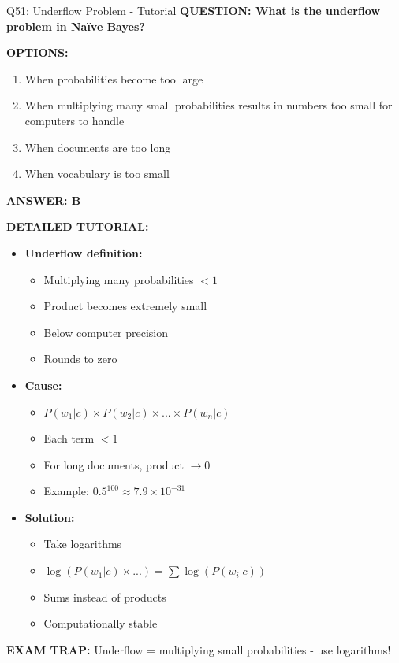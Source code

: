 \documentclass[8pt]{beamer}
\begin{document}
	\begin{frame}{Q51: Underflow Problem - Tutorial}
		\fontsize{6.5}{7.5}\selectfont
		\textbf{QUESTION: What is the underflow problem in Naïve Bayes?}
		
		\vspace{0.1cm}
		\textbf{OPTIONS:}
		\begin{enumerate}
			\item When probabilities become too large
			\item When multiplying many small probabilities results in numbers too small for computers to handle
			\item When documents are too long
			\item When vocabulary is too small
		\end{enumerate}
		
		\vspace{0.1cm}
		\textcolor{myblue}{\textbf{ANSWER: B}}
		
		\vspace{0.1cm}
		\textbf{DETAILED TUTORIAL:}
		\begin{itemize}
			\item \textbf{Underflow definition:}
			\begin{itemize}
				\item Multiplying many probabilities $< 1$
				\item Product becomes extremely small
				\item Below computer precision
				\item Rounds to zero
			\end{itemize}
			\item \textbf{Cause:}
			\begin{itemize}
				\item $P(w_1|c) \times P(w_2|c) \times ... \times P(w_n|c)$
				\item Each term $< 1$
				\item For long documents, product $\to 0$
				\item Example: $0.5^{100} \approx 7.9 \times 10^{-31}$
			\end{itemize}
			\item \textbf{Solution:}
			\begin{itemize}
				\item Take logarithms
				\item $\log(P(w_1|c) \times ...) = \sum \log(P(w_i|c))$
				\item Sums instead of products
				\item Computationally stable
			\end{itemize}
		\end{itemize}
		
		\textcolor{myred}{\textbf{EXAM TRAP:}} Underflow = \textcolor{myblue}{multiplying small probabilities} - use logarithms!
	\end{frame}
	
\end{document}
